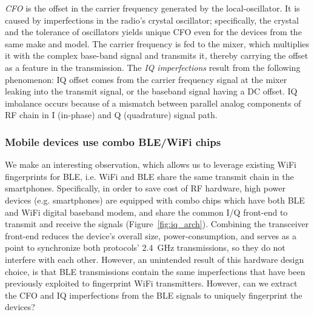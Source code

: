  \emph{CFO} is the offset in the carrier
frequency generated by the local-oscillator. 
It is caused by imperfections in the radio's
crystal oscillator; specifically, the crystal and the tolerance of oscillators
yields unique CFO even for the devices from the same make and model. 
The carrier frequency is fed to the mixer, which multiplies it with the complex base-band signal and
transmits it, thereby carrying the offset as a feature in the transmission. The \emph{IQ imperfections} result from the following phenomenon: IQ offset
comes from the carrier frequency signal at the mixer leaking into the transmit signal, 
or the baseband signal having a DC offset. %
IQ imbalance occurs because of a mismatch
between parallel analog components of RF chain in I (in-phase) and Q
(quadrature) signal path.%



\subsubsection*{Mobile devices use combo BLE/WiFi chips}
%
We make an interesting observation, which allows us to leverage existing WiFi fingerprints for BLE,
 i.e. WiFi and BLE share the same transmit chain in the smartphones.
Specifically, in order to save cost of RF hardware, high power devices (e.g. smartphones) are
equipped with combo chips which have both BLE and WiFi digital baseband modem, and
share the common I/Q front-end to transmit and receive the signals 
(Figure~\ref{fig:iq_arch}).
%
Combining the transceiver front-end reduces the device's overall size, power-consumption, and serves as a
point to synchronize both protocols' 2.4~GHz transmissions, so they do not
interfere with each other.
%
However, an unintended result of this hardware design choice, is that BLE
transmissions contain the same imperfections that have been previously exploited to fingerprint WiFi transmitters.
%
However, can we extract the CFO and IQ imperfections from the
BLE signals to uniquely fingerprint the devices?


